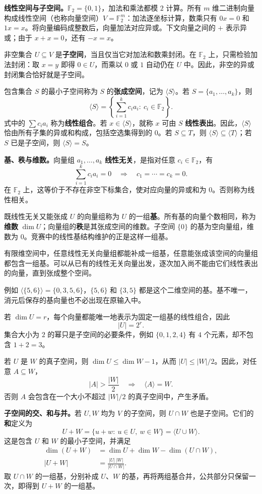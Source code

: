 \textbf{线性空间与子空间。}$\mathbb F_2=\{0,1\}$，加法和乘法都模 $2$ 计算。所有 $m$ 维二进制向量构成线性空间（也称向量空间）$V=\mathbb F_2^m$：加法逐坐标计算，数乘只有 $0x=0$ 和 $1x=x$。将向量编码成整数后，向量加法对应异或。下文向量之间的 $+$ 表示异或；由于 $x+x=0$，还有 $-x=x$。

非空集合 $U\subseteq V$ 是\textbf{子空间}，当且仅当它对加法和数乘封闭。在 $\mathbb F_2$ 上，只需检验加法封闭：取 $x=y$ 即得 $0\in U$，而乘以 $0$ 或 $1$ 自动仍在 $U$ 中。因此，非空的异或封闭集合恰好就是子空间。

包含集合 $S$ 的最小子空间称为 $S$ 的\textbf{张成空间}，记为 $\langle S\rangle$。若 $S=\{a_1,\ldots,a_k\}$，则
\[
\langle S\rangle=\left\{\sum_{i=1}^k c_i a_i:\ c_i\in\mathbb F_2\right\}.
\]
式中的 $\sum c_i a_i$ 称为\textbf{线性组合}。若 $x\in\langle S\rangle$，就称 $x$ 可由 $S$ \textbf{线性表出}。因此，$\langle S\rangle$ 恰由所有子集的异或和构成，包括空选集得到的 $0$。若 $S\subseteq T$，则 $\langle S\rangle\subseteq\langle T\rangle$；若 $S$ 已是子空间，则 $\langle S\rangle=S$。

\textbf{基、秩与维数。}向量组 $a_1,\ldots,a_k$ \textbf{线性无关}，是指对任意 $c_i\in\mathbb F_2$，有
\[
\sum_{i=1}^k c_i a_i=0\quad\Longrightarrow\quad c_1=\cdots=c_k=0.
\]
在 $\mathbb F_2$ 上，这等价于不存在非空下标集合，使对应向量的异或和为 $0$。否则称为线性相关。

既线性无关又能张成 $U$ 的向量组称为 $U$ 的一组\textbf{基}。所有基的向量个数相同，称为\textbf{维数} $\dim U$；向量组的\textbf{秩}是其张成空间的维数。子空间 $\{0\}$ 的基为空向量组，维数为 $0$。竞赛中的线性基结构维护的正是这样一组基。

有限维空间中，任意线性无关向量组都能补成一组基，任意能张成该空间的向量组都包含一组基。可以从已有的线性无关向量出发，逐次加入尚不能由它们线性表出的向量，直到张成整个空间。

例如 $\langle\{5,6\}\rangle=\{0,3,5,6\}$，$\{5,6\}$ 和 $\{3,5\}$ 都是这个二维空间的基。基不唯一，消元后保存的基向量也不必出现在原输入中。

若 $\dim U=r$，每个向量都能唯一地表示为固定一组基的线性组合，因此
\[
|U|=2^r.
\]
集合大小为 $2$ 的幂只是子空间的必要条件，例如 $\{0,1,2,4\}$ 有 $4$ 个元素，却不包含 $1+2=3$。

若 $U$ 是 $W$ 的真子空间，则 $\dim U\le\dim W-1$，从而 $|U|\le|W|/2$。因此，对任意 $A\subseteq W$，
\[
|A|>\frac{|W|}{2}\quad\Longrightarrow\quad\langle A\rangle=W.
\]
否则 $A$ 会包含在一个大小不超过 $|W|/2$ 的真子空间中，产生矛盾。

\textbf{子空间的交、和与并。}若 $U,W$ 均为 $V$ 的子空间，则 $U\cap W$ 也是子空间。它们的\textbf{和}定义为
\[
U+W=\{u+w:\ u\in U,\ w\in W\}=\langle U\cup W\rangle.
\]
这是包含 $U$ 和 $W$ 的最小子空间，并满足
\[
\begin{aligned}
\dim(U+W)&=\dim U+\dim W-\dim(U\cap W),\\
|U+W|&=\frac{|U|\,|W|}{|U\cap W|}.
\end{aligned}
\]
取 $U\cap W$ 的一组基，分别补成 $U$、$W$ 的基，再将两组基合并，公共部分只保留一次，即得到 $U+W$ 的一组基。

